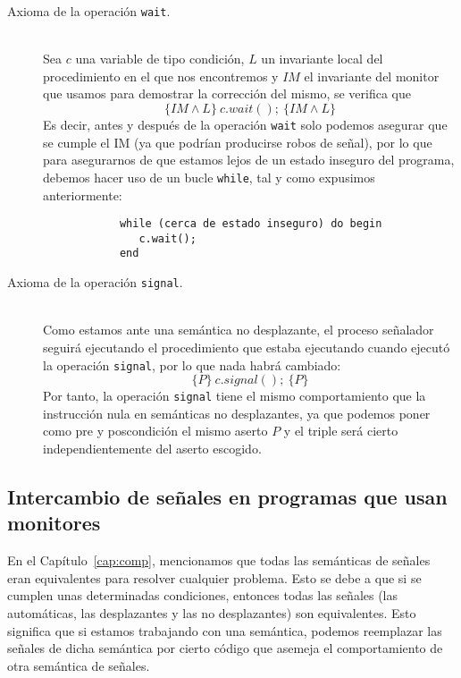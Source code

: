 \begin{description}
    \item [Axioma de la operación \texttt{wait}.]~\\
        Sea $c$ una variable de tipo condición, $L$ un invariante local del procedimiento en el que nos encontremos y $IM$ el invariante del monitor que usamos para demostrar la corrección del mismo, se verifica que
        \begin{equation*}
            \{IM \land L\}\ c.wait();\ \{IM \land L\}
        \end{equation*}
        Es decir, antes y después de la operación \verb|wait| solo podemos asegurar que se cumple el IM (ya que podrían producirse robos de señal), por lo que para asegurarnos de que estamos lejos de un estado inseguro del programa, debemos hacer uso de un bucle \verb|while|, tal y como expusimos anteriormente:
        \begin{verbatim}
            while (cerca de estado inseguro) do begin
               c.wait();
            end
        \end{verbatim}
    \item [Axioma de la operación \texttt{signal}.]~\\
        Como estamos ante una semántica no desplazante, el proceso señalador seguirá ejecutando el procedimiento que estaba ejecutando cuando ejecutó la operación \verb|signal|, por lo que nada habrá cambiado:
        \begin{equation*}
            \{P\}\ c.signal();\ \{P\}
        \end{equation*}
        Por tanto, la operación \verb|signal| tiene el mismo comportamiento que la instrucción nula en semánticas no desplazantes, ya que podemos poner como pre y poscondición el mismo aserto $P$ y el triple será cierto independientemente del aserto escogido.
\end{description}

\subsection{Intercambio de señales en programas que usan monitores}
En el Capítulo~\ref{cap:comp}, mencionamos que todas las semánticas de señales eran equivalentes para resolver cualquier problema. Esto se debe a que si se cumplen unas determinadas condiciones, entonces todas las señales (las automáticas, las desplazantes y las no desplazantes) son equivalentes. Esto significa que si estamos trabajando con una semántica, podemos reemplazar las señales de dicha semántica por cierto código que asemeja el comportamiento de otra semántica de señales.\\

